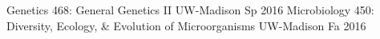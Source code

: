 

\begin{cvhonors}
  \cvhonor
    {Genetics 468: General Genetics II} %
    {UW-Madison} %
    {Sp 2016} %
  \cvhonor
    {Microbiology 450: Diversity, Ecology, \& Evolution of Microorganisms} %
    {UW-Madison} %
    {Fa 2016} %
\end{cvhonors}